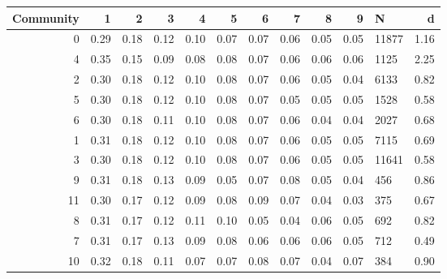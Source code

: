 \begin{tabular}{rrrrrrrrrrlr}
\toprule
 Community &    1 &    2 &    3 &    4 &    5 &    6 &    7 &    8 &    9 &      N &    d \\
\midrule
         0 & 0.29 & 0.18 & 0.12 & 0.10 & 0.07 & 0.07 & 0.06 & 0.05 & 0.05 &  11877 & 1.16 \\
         4 & 0.35 & 0.15 & 0.09 & 0.08 & 0.08 & 0.07 & 0.06 & 0.06 & 0.06 &   1125 & 2.25 \\
         2 & 0.30 & 0.18 & 0.12 & 0.10 & 0.08 & 0.07 & 0.06 & 0.05 & 0.04 &   6133 & 0.82 \\
         5 & 0.30 & 0.18 & 0.12 & 0.10 & 0.08 & 0.07 & 0.05 & 0.05 & 0.05 &   1528 & 0.58 \\
         6 & 0.30 & 0.18 & 0.11 & 0.10 & 0.08 & 0.07 & 0.06 & 0.04 & 0.04 &   2027 & 0.68 \\
         1 & 0.31 & 0.18 & 0.12 & 0.10 & 0.08 & 0.07 & 0.06 & 0.05 & 0.05 &   7115 & 0.69 \\
         3 & 0.30 & 0.18 & 0.12 & 0.10 & 0.08 & 0.07 & 0.06 & 0.05 & 0.05 &  11641 & 0.58 \\
         9 & 0.31 & 0.18 & 0.13 & 0.09 & 0.05 & 0.07 & 0.08 & 0.05 & 0.04 &    456 & 0.86 \\
        11 & 0.30 & 0.17 & 0.12 & 0.09 & 0.08 & 0.09 & 0.07 & 0.04 & 0.03 &    375 & 0.67 \\
         8 & 0.31 & 0.17 & 0.12 & 0.11 & 0.10 & 0.05 & 0.04 & 0.06 & 0.05 &    692 & 0.82 \\
         7 & 0.31 & 0.17 & 0.13 & 0.09 & 0.08 & 0.06 & 0.06 & 0.06 & 0.05 &    712 & 0.49 \\
        10 & 0.32 & 0.18 & 0.11 & 0.07 & 0.07 & 0.08 & 0.07 & 0.04 & 0.07 &    384 & 0.90 \\
\bottomrule
\end{tabular}

